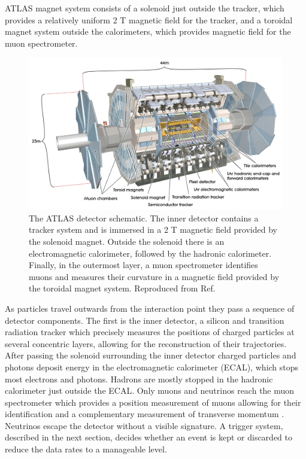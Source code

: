 ATLAS magnet system consists of a solenoid just outside the tracker,
which provides a relatively uniform 2 T magnetic field for the
tracker, and a toroidal magnet system outside the calorimeters, which provides
magnetic field for the muon spectrometer.

\begin{figure}[h]
  \centering
  \includegraphics[width=1\textwidth]{figures/experiment/atlas}
  \caption[The ATLAS detector]{The ATLAS detector schematic. The inner
  detector contains a tracker system and is immersed in a 2 T magnetic field
  provided by the solenoid magnet. Outside the solenoid there is
  an electromagnetic calorimeter, followed by the hadronic calorimeter.
  Finally, in the outermost layer, a muon spectrometer identifies muons
  and measures their curvature in a magnetic field provided by the
  toroidal magnet system.
  Reproduced from Ref. \cite{Aad:2008zzm}}
   \label{fig:exp:atlas}
\end{figure}

As particles travel outwards from the interaction point they pass a
sequence of detector components. The first is the inner detector,
a silicon and transition radiation tracker which precisely measures the
positions of charged particles at several concentric layers, allowing for
the reconstruction of their trajectories. After passing the solenoid
surrounding the inner detector charged particles and photons deposit
energy in the electromagnetic calorimeter (ECAL), which stops most electrons
and photons. Hadrons are mostly stopped in the hadronic calorimeter
just outside the ECAL. Only muons and neutrinos reach the muon spectrometer
which provides a position measurement of muons allowing for their
identification and a complementary measurement of transverse momentum
\cite{Aad:2008zzm}. Neutrinos escape the detector without a visible
signature. A trigger system, described in the next section,
decides whether an event is kept or discarded to reduce the data
rates to a manageable level.

